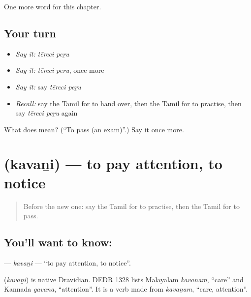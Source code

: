 \begin{grammarlens}[title={What you've built}]
One more word for this chapter.
\end{grammarlens}

\subsection*{Your turn}
\begin{itemize}
\raggedright
  \item \emph{Say it:} \emph{tērcci peṟu}
  \item \emph{Say it:} \emph{tērcci peṟu}, once more
  \item \emph{Say it:} say \emph{tērcci peṟu}
  \item \emph{Recall:} say the Tamil for to hand over, then the Tamil for to practise, then say \emph{tērcci peṟu} again
\end{itemize}

\begin{tcolorbox}[breakable,colback=teal!4,colframe=teal!35!black,title={Before you move on}]
What does   mean? (\textquotedblleft{}To pass (an exam)\textquotedblright{}.) Say it once more.
\end{tcolorbox}
\section[\texorpdfstring{\ta{கவனி} (kavaṉi)}{கவனி (kavaṉi)}]{ (kavaṉi) — to pay attention, to notice}

\label{lesson:TA-C164-kavani}



\begin{quote}
Before the new one: say the Tamil for to practise, then the Tamil for to pass.
\end{quote}

\subsection*{You'll want to know: }
\textbf{} — \emph{kavaṉi} — \textquotedblleft{}to pay attention, to notice\textquotedblright{}.

\begin{cousinweb}
\textbf{} (\emph{kavaṉi}) is native Dravidian. DEDR 1328 lists Malayalam \emph{kavanam}, \textquotedblleft{}care\textquotedblright{} and Kannada \emph{gavana}, \textquotedblleft{}attention\textquotedblright{}. It is a verb made from \emph{kavaṉam}, \textquotedblleft{}care, attention\textquotedblright{}.
\end{cousinweb}

